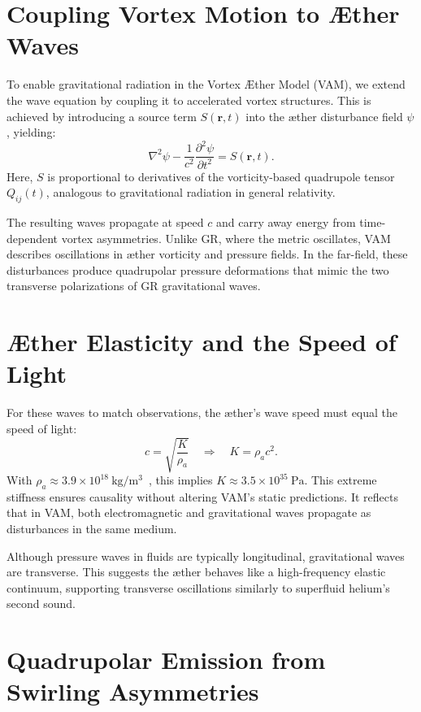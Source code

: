 \section*{Coupling Vortex Motion to Æther Waves}

To enable gravitational radiation in the Vortex Æther Model (VAM), we extend the wave equation by coupling it to accelerated vortex structures. This is achieved by introducing a source term $S(\mathbf{r}, t)$ into the æther disturbance field $\psi$, yielding:
\begin{equation}
\nabla^2 \psi - \frac{1}{c^2} \frac{\partial^2 \psi}{\partial t^2} = S(\mathbf{r}, t).
\end{equation}
Here, $S$ is proportional to derivatives of the vorticity-based quadrupole tensor $Q_{ij}(t)$, analogous to gravitational radiation in general relativity.

The resulting waves propagate at speed $c$ and carry away energy from time-dependent vortex asymmetries. Unlike GR, where the metric oscillates, VAM describes oscillations in æther vorticity and pressure fields. In the far-field, these disturbances produce quadrupolar pressure deformations that mimic the two transverse polarizations of GR gravitational waves.

\section*{Æther Elasticity and the Speed of Light}

For these waves to match observations, the æther’s wave speed must equal the speed of light:
\begin{equation}
c = \sqrt{\frac{K}{\rho_a}} \quad \Rightarrow \quad K = \rho_a c^2.
\end{equation}
With $\rho_a \approx 3.9 \times 10^{18}~\mathrm{kg/m^3}$~\cite{iskandarani2025VAM2}, this implies $K \approx 3.5 \times 10^{35}~\mathrm{Pa}$. This extreme stiffness ensures causality without altering VAM’s static predictions. It reflects that in VAM, both electromagnetic and gravitational waves propagate as disturbances in the same medium.

Although pressure waves in fluids are typically longitudinal, gravitational waves are transverse. This suggests the æther behaves like a high-frequency elastic continuum, supporting transverse oscillations similarly to superfluid helium's second sound.

\section*{Quadrupolar Emission from Swirling Asymmetries}

